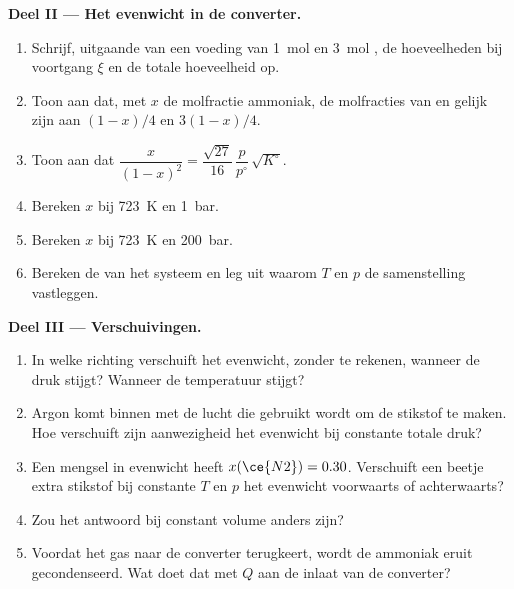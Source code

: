 \begin{problem}
\medskip
\noindent\textbf{Deel II --- Het evenwicht in de converter.}
\begin{enumerate}[resume]
  \item Schrijf, uitgaande van een voeding van \qty{1}{mol}  en \qty{3}{mol} , de
        hoeveelheden bij voortgang $\xi$ en de totale hoeveelheid op.
  \item Toon aan dat, met $x$ de molfractie ammoniak, de molfracties
        van  en  gelijk zijn aan $(1-x)/4$ en $3(1-x)/4$.
  \item Toon aan dat $\dfrac{x}{(1-x)^2} = \dfrac{\sqrt{27}}{16}\,\dfrac{p}{p^\circ}\,
        \sqrt{K^\circ}$.
  \item Bereken $x$ bij \qty{723}{K} en \qty{1}{bar}.
  \item Bereken $x$ bij \qty{723}{K} en \qty{200}{bar}.
  \item Bereken de  van het systeem en leg uit waarom $T$ en $p$ de
        samenstelling vastleggen.
\end{enumerate}

\medskip
\noindent\textbf{Deel III --- Verschuivingen.}
\begin{enumerate}[resume]
  \item In welke richting verschuift het evenwicht, zonder te rekenen, wanneer
        de druk stijgt? Wanneer de temperatuur stijgt?
  \item Argon komt binnen met de lucht die gebruikt wordt om de stikstof te maken. Hoe verschuift
        zijn aanwezigheid het evenwicht bij constante totale druk?
  \item Een mengsel in evenwicht heeft $x(\ce{N2}) = 0.30$. Verschuift een beetje
        extra stikstof bij constante $T$ en $p$ het evenwicht voorwaarts of achterwaarts?
  \item Zou het antwoord bij constant volume anders zijn?
  \item Voordat het gas naar de converter terugkeert, wordt de ammoniak eruit
        gecondenseerd. Wat doet dat met $Q$ aan de inlaat van de converter?
\end{enumerate}


\end{problem}
